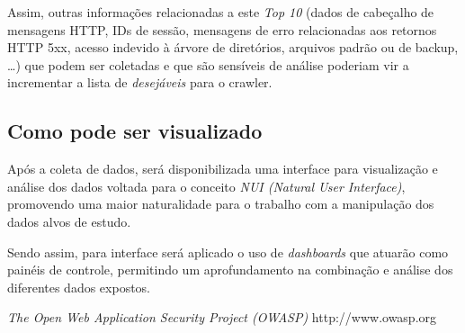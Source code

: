 \documentclass[a4paper]{article}
\begin{document}
Assim, outras informações relacionadas a este \emph{Top 10} (dados de cabeçalho de mensagens HTTP, IDs de sessão, mensagens de erro relacionadas aos retornos HTTP 5xx, acesso indevido à árvore de diretórios, arquivos padrão ou de backup, \dots) que podem ser coletadas e que são sensíveis de análise poderiam vir a incrementar a lista de \emph{desejáveis} para o crawler.

\subsection{Como pode ser visualizado}

Após a coleta de dados, será disponibilizada uma interface para visualização e análise dos dados voltada para o conceito \emph{NUI (Natural User Interface)}, promovendo uma maior naturalidade para o trabalho com a manipulação dos dados alvos de estudo.

Sendo assim, para interface será aplicado o uso de \emph{dashboards} que atuarão como painéis de controle, permitindo um aprofundamento na combinação e análise dos diferentes dados expostos.

\begin{thebibliography}{9}

  \emph{The Open Web Application Security Project (OWASP)}
  http://www.owasp.org

\end{thebibliography}
\end{document}
